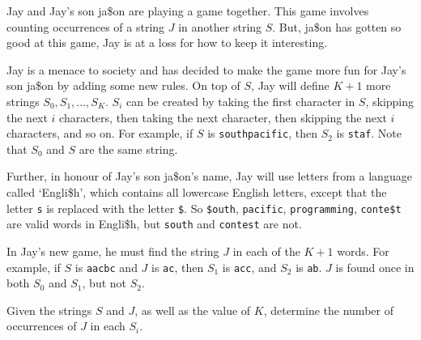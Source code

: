 Jay and Jay's son ja\$on are playing a game together. This game involves counting
occurrences of a string $J$ in another string $S$. But, ja\$on has
gotten so good at this game, Jay is at a loss for how to keep it interesting.

Jay is a menace to society and has decided to make the game more fun for Jay's
son ja\$on by adding some new rules. On top of $S$, Jay will define $K + 1$ more strings
$S_0, S_1, \dots, S_K$. $S_i$ can be created by taking the first character in $S$, skipping the next $i$ characters, then taking the next character, then skipping the next $i$ characters, and so on. For example, if $S$ is \texttt{southpacific}, then $S_2$ is \texttt{staf}. Note that $S_0$ and $S$ are the same string.

Further, in honour of Jay's son ja\$on's name, Jay will use letters from a language called `Engli\$h', which contains all lowercase English letters, except that the letter \texttt{s} is replaced with the letter \texttt{\$}. So \texttt{\$outh}, \texttt{pacific}, \texttt{programming}, \texttt{conte\$t} are valid words in Engli\$h, but \texttt{south} and \texttt{contest} are not.

In Jay's new game, he must find the string $J$ in each of the $K+1$ words.
For example, if $S$ is \texttt{aacbc} and $J$ is \texttt{ac}, then $S_1$ is \texttt{acc}, and $S_2$ is \texttt{ab}. $J$ is found once in both $S_0$ and $S_1$, but not $S_2$.

Given the strings $S$ and $J$, as well as the value of $K$, determine the number of occurrences of $J$ in each $S_i$.
